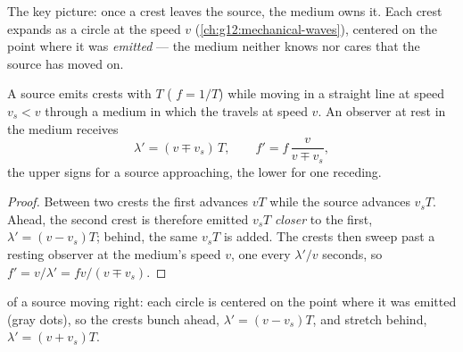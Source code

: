 The key picture: once a crest leaves the source, the medium owns it. Each crest expands as
a circle at the  speed $v$ (\cref{ch:g12:mechanical-waves}), centered on the point where
it was \emph{emitted} --- the medium neither knows nor cares that the source has moved on.

\begin{proposition}\label{prop:g12:doppler-effect:moving-source}
A source emits crests with  $T$ ( $f = 1/T$) while moving in a straight
line at speed $v_s < v$ through a medium in which the  travels at speed $v$. An
observer at rest in the medium receives
\[
\lambda' = (v \mp v_s)\,T, \qquad f' = f\,\frac{v}{v \mp v_s},
\]
the upper signs for a source approaching, the lower for one receding.
\end{proposition}

\begin{proof}
Between two crests the first advances $vT$ while the source advances $v_s T$. Ahead, the
second crest is therefore emitted $v_s T$ \emph{closer} to the first, $\lambda' = (v - v_s)T$;
behind, the same $v_s T$ is added. The crests then sweep past a resting observer at the
medium's speed $v$, one every $\lambda'/v$ seconds, so $f' = v/\lambda' = f v/(v \mp v_s)$.
\end{proof}

\begin{omfigure}

{\small {} of a source moving right: each circle is centered on the point where
it was emitted (gray dots), so the crests bunch ahead, $\lambda' = (v - v_s)T$, and
stretch behind, $\lambda' = (v + v_s)T$.}
\end{omfigure}

